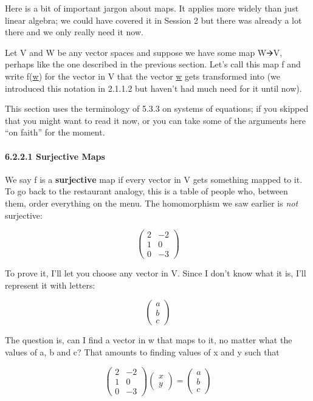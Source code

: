 \documentclass[oneside,english]{amsbook}
\numberwithin{section}{chapter}
\theoremstyle{plain}
\theoremstyle{definition}
\begin{document}
Here is a bit of important jargon about maps. It applies more widely
than just linear algebra; we could have covered it in Session 2 but
there was already a lot there and we only really need it now.

Let V and W be any vector spaces and suppose we have some map W🡪V,
perhaps like the one described in the previous section. Let's call this
map f and write f(\ul{w}) for the vector in V that the vector \ul{w}
gets transformed into (we introduced this notation in 2.1.1.2 but
haven't had much need for it until now).

This section uses the terminology of 5.3.3 on systems of equations; if
you skipped that you might want to read it now, or you can take some of
the arguments here ``on faith'' for the moment.

\paragraph{6.2.2.1 Surjective Maps}\label{surjective-maps}

We say f is a \textbf{surjective} map if every vector in V gets
something mapped to it. To go back to the restaurant analogy, this is a
table of people who, between them, order everything on the menu. The
homomorphism we saw earlier is \emph{not} surjective:

\[\begin{pmatrix}
	2 & - 2 \\
	1 & 0 \\
	0 & - 3
\end{pmatrix}\]

To prove it, I'll let you choose any vector in V. Since I don't know
what it is, I'll represent it with letters:

\[\begin{pmatrix}
	a \\
	b \\
	c
\end{pmatrix}\]

The question is, can I find a vector in w that maps to it, no matter
what the values of a, b and c? That amounts to finding values of x and y
such that

\[\begin{pmatrix}
	2 & - 2 \\
	1 & 0 \\
	0 & - 3
\end{pmatrix}\begin{pmatrix}
	x \\
	y
\end{pmatrix} = \begin{pmatrix}
	a \\
	b \\
	c
\end{pmatrix}\]
\end{document}
